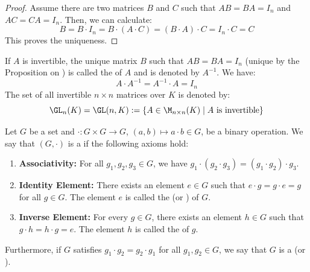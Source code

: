 \begin{proof}
Assume there are two matrices $B$ and $C$ such that $AB = BA = I_n$ and $AC = CA = I_n$. Then, we can calculate:
\begin{equation*}
    B = B \cdot I_n = B \cdot (A \cdot C) = (B \cdot A) \cdot C = I_n \cdot C = C
\end{equation*}
This proves the uniqueness.
\end{proof}

\begin{definition}
\label{def:inverse_matrix_and_gl}
If $A$ is invertible, the unique matrix $B$ such that $AB = BA = I_n$ (unique by the Proposition on ) is called the  of $A$ and is denoted by $A^{-1}$. We have:
\begin{equation*}
    A \cdot A^{-1} = A^{-1} \cdot A = I_n
\end{equation*}
The set of all invertible $n \times n$ matrices over $K$ is denoted by:
\begin{equation*}
    \GL_n(K) = \GL(n, K) := \{A \in \M_{n \times n}(K) \mid A \text{ is invertible}\}
\end{equation*}
\end{definition}

\begin{definition}[Group]
\label{def:group}
Let $G$ be a set and $\cdot : G \times G \to G$, $(a,b) \mapsto a \cdot b \in G$, be a binary operation. We say that $(G, \cdot)$ is a  if the following axioms hold:
\begin{enumerate}
    \item \textbf{Associativity:} For all $g_1, g_2, g_3 \in G$, we have $g_1 \cdot (g_2 \cdot g_3) = (g_1 \cdot g_2) \cdot g_3$.
    \item \textbf{Identity Element:} There exists an element $e \in G$ such that $e \cdot g = g \cdot e = g$ for all $g \in G$. The element $e$ is called the  (or ) of $G$.
    \item \textbf{Inverse Element:} For every $g \in G$, there exists an element $h \in G$ such that $g \cdot h = h \cdot g = e$. The element $h$ is called the  of $g$.
\end{enumerate}
Furthermore, if $G$ satisfies $g_1 \cdot g_2 = g_2 \cdot g_1$ for all $g_1, g_2 \in G$, we say that $G$ is a  (or ).
\end{definition}

